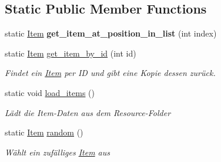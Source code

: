 \subsection*{Static Public Member Functions}
\begin{DoxyCompactItemize}
\item 
\mbox{\label{class_item_a397f3378e09c0c3e2b7552376770a8ed}} 
static \hyperlink{class_item}{Item} {\bfseries get\+\_\+item\+\_\+at\+\_\+position\+\_\+in\+\_\+list} (int index)
\item 
static \hyperlink{class_item}{Item} \hyperlink{class_item_a434d366123e8cde420cd08d6d55cf2e2}{get\+\_\+item\+\_\+by\+\_\+id} (int id)
\begin{DoxyCompactList}\small\item\em Findet ein \hyperlink{class_item}{Item} per ID und gibt eine Kopie dessen zurück. \end{DoxyCompactList}\item 
static void \hyperlink{class_item_abb13a205923316049fa1854b954a55a0}{load\+\_\+items} ()
\begin{DoxyCompactList}\small\item\em Lädt die Item-\/\+Daten aus dem Resource-\/\+Folder \end{DoxyCompactList}\item 
static \hyperlink{class_item}{Item} \hyperlink{class_item_a6728fc973c3b5a55a14fcfe8c65c541c}{random} ()
\begin{DoxyCompactList}\small\item\em Wählt ein zufälliges \hyperlink{class_item}{Item} aus \end{DoxyCompactList}\end{DoxyCompactItemize}
